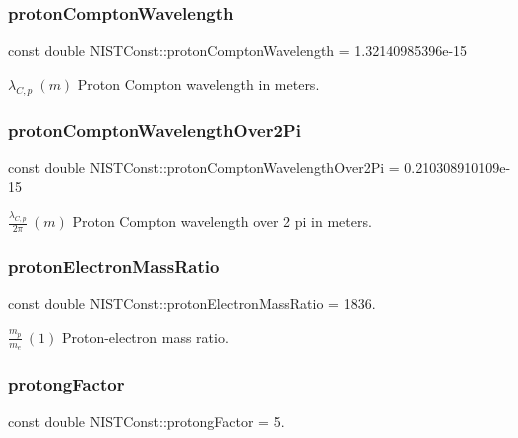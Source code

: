 \subsubsection{\texorpdfstring{proton\+Compton\+Wavelength}{protonComptonWavelength}}
{\footnotesize\ttfamily const double N\+I\+S\+T\+Const\+::proton\+Compton\+Wavelength = 1.\+32140985396e-\/15}

$\lambda_{C,p} \ (m)$ Proton Compton wavelength in meters. \mbox{\label{group___n_i_s_t_const-_proton_gaedddad375441d4bf1013089ba0004da5}} 
\subsubsection{\texorpdfstring{proton\+Compton\+Wavelength\+Over2\+Pi}{protonComptonWavelengthOver2Pi}}
{\footnotesize\ttfamily const double N\+I\+S\+T\+Const\+::proton\+Compton\+Wavelength\+Over2\+Pi = 0.\+210308910109e-\/15}

$\frac{\lambda_{C,p}}{2\pi}\ (m)$ Proton Compton wavelength over 2 pi in meters. \mbox{\label{group___n_i_s_t_const-_proton_gae88fb4c421a252321d15b0f93ad19954}} 
\subsubsection{\texorpdfstring{proton\+Electron\+Mass\+Ratio}{protonElectronMassRatio}}
{\footnotesize\ttfamily const double N\+I\+S\+T\+Const\+::proton\+Electron\+Mass\+Ratio = 1836.}

$\frac{m_p}{m_e} \ (1)$ Proton-\/electron mass ratio. \mbox{\label{group___n_i_s_t_const-_proton_gafdc26fffabee1319028bd7f61d561be5}} 
\subsubsection{\texorpdfstring{protong\+Factor}{protongFactor}}
{\footnotesize\ttfamily const double N\+I\+S\+T\+Const\+::protong\+Factor = 5.}

